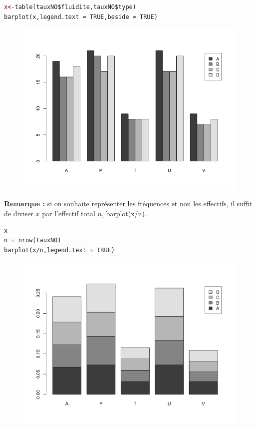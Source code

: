 \begin{lstlisting}[language=html]
x<-table(tauxNO$fluidite,tauxNO$type)
barplot(x,legend.text = TRUE,beside = TRUE)
\end{lstlisting}
\begin{figure}[H]\begin{center}\includegraphics[scale=0.5]{ilu/ccm15.png}\end{center}\end{figure}
\textbf{Remarque : } si on souhaite représenter les fréquences et non les effectifs, il suffit de diviser $x$ par l'effectif total $n$, barplot(x/n).
\begin{lstlisting}[language=html]
x
n = nrow(tauxNO)
barplot(x/n,legend.text = TRUE)
\end{lstlisting}
\begin{figure}[H]\begin{center}\includegraphics[scale=0.5]{ilu/ccm16.png}\end{center}\end{figure}
